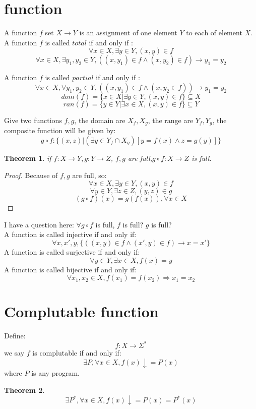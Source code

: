 \documentclass[10pt,a4paper]{article}
\newtheorem{theorem}{Theorem}[section]
\begin{document}
\section{function}
A function $f$ set $X\to Y$ is an assignment of one element $Y$ to each of element $X$.\\

A function $f$ is called $total$ if and only if :
\[\forall x\in X,\exists y\in Y,(x,y)\in f\]
\[\forall x\in X,\exists y_1,y_2\in Y,((x,y_1)\in f\land(x,y_2)\in f)\to y_1=y_2\]

A function $f$ is called $partial$ if and only if :
\[\forall x\in X,\forall y_1,y_2\in Y,((x,y_1)\in f\land(x,y_2\in f))\to y_1=y_2\]
\[dom(f)=\{x\in X|\exists y\in Y,(x,y)\in f\}\subseteq X\]
\[ran(f)=\{y\in Y|\exists x\in X,(x,y)\in f\}\subseteq Y\]

Give two functions $f,g$, the domain are $X_f,X_g$, the range are $Y_f,Y_g$, the composite function will be given by:
\[g\circ f:\{(x,z)|(\exists y\in Y_f\cap X_g)[y=f(x)\land z=g(y)]\}\]

\begin{theorem}
    if $f: X\to Y,g: Y\to Z$, $f,g$ are full,$g\circ f: X\to Z$ is full.
\end{theorem}
\begin{proof}
    Because of $f,g$ are full, so:
    \[\forall x\in X,\exists y\in Y,(x,y)\in f\]
    \[\forall y\in Y,\exists z\in Z,(y,z)\in g\]
    \[(g\circ f)(x)=g(f(x)),\forall x\in X\]
\end{proof}
I have a question here: $\forall g\circ f$ is full, $f$ is full? $g$ is full?\\

A function is called injective if and only if:
\[\forall x,x',y,\{((x,y)\in f\land (x',y)\in f)\to x=x'\}\]
A function is called surjective if and only if:
\[\forall y\in Y,\exists x\in X,f(x)=y\]
A function is called bijective if and only if:
\[\forall x_1,x_2\in X,f(x_1)=f(x_2)\Rightarrow x_1=x_2\]
\section{Complutable function}
Define:
\[f:X\to \Sigma^*\]
we say $f$ is complutable if and only if:
\[\exists P,\forall x\in X,f(x)\downarrow=P(x)\]
where $P$ is any program.
\begin{theorem}
    \[\exists P^*,\forall x\in X,f(x)\downarrow=P(x)=P^*(x)\]
\end{theorem}
\end{document}

